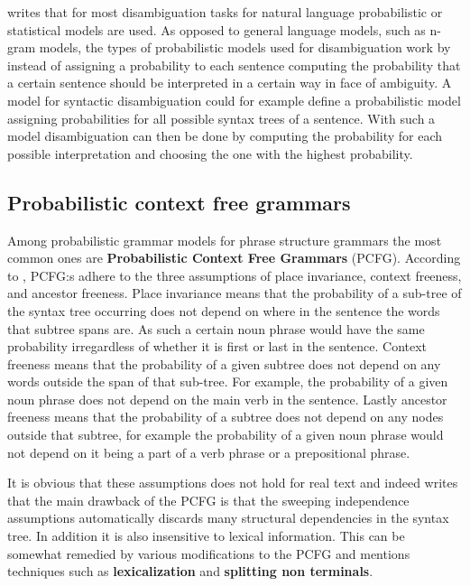 \citet{jurafsky2009speech} writes that for most disambiguation tasks for natural language probabilistic or statistical models are used. As opposed to general language models, such as n-gram models, the types of probabilistic models used for disambiguation work by instead of assigning a probability to each sentence computing the probability that a certain sentence should be interpreted in a certain way in face of ambiguity. A model for syntactic disambiguation could for example define a probabilistic model assigning probabilities for all possible syntax trees of a sentence. With such a model disambiguation can then be done by computing the probability for each possible interpretation and choosing the one with the highest probability.

\subsection{Probabilistic context free grammars}
Among probabilistic grammar models for phrase structure grammars the most common ones are \textbf{Probabilistic Context Free Grammars} (PCFG). According to \citet{manning1999foundations}, PCFG:s adhere to the three assumptions of place invariance, context freeness, and ancestor freeness. Place invariance means that the probability of a sub-tree of the syntax tree occurring does not depend on where in the sentence the words that subtree spans are. As such a certain noun phrase would have the same probability irregardless of whether it is first or last in the sentence. Context freeness means that the probability of a given subtree does not depend on any words outside the span of that sub-tree. For example, the probability of a given noun phrase does not depend on the main verb in the sentence. Lastly ancestor freeness means that the probability of a subtree does not depend on any nodes outside that subtree, for example the probability of a given noun phrase would not depend on it being a part of a verb phrase or a prepositional phrase.

It is obvious that these assumptions does not hold for real text and \citet{jurafsky2009speech} indeed writes that the main drawback of the PCFG is that the sweeping independence assumptions automatically discards many structural dependencies in the syntax tree. In addition it is also insensitive to lexical information. This can be somewhat remedied by various modifications to the PCFG and \citet{jurafsky2009speech} mentions techniques such as \textbf{lexicalization} and \textbf{splitting non terminals}. 

